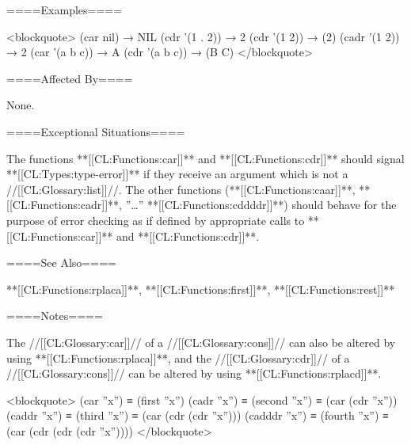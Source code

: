====Examples====

<blockquote> (car nil) → NIL (cdr '(1 . 2)) → 2 (cdr '(1 2)) → (2) (cadr '(1 2)) → 2 (car '(a b c)) → A (cdr '(a b c)) → (B C) </blockquote>

====Affected By====

None.

====Exceptional Situations====

The functions **[[CL:Functions:car]]** and **[[CL:Functions:cdr]]** should signal **[[CL:Types:type-error]]** if they receive an argument which is not a //[[CL:Glossary:list]]//. The other functions (**[[CL:Functions:caar]]**, **[[CL:Functions:cadr]]**, ''\ldots'' **[[CL:Functions:cddddr]]**) should behave for the purpose of error checking as if defined by appropriate calls to **[[CL:Functions:car]]** and **[[CL:Functions:cdr]]**.

====See Also====

**[[CL:Functions:rplaca]]**, **[[CL:Functions:first]]**, **[[CL:Functions:rest]]**

====Notes====

The //[[CL:Glossary:car]]// of a //[[CL:Glossary:cons]]// can also be altered by using **[[CL:Functions:rplaca]]**, and the //[[CL:Glossary:cdr]]// of a //[[CL:Glossary:cons]]// can be altered by using **[[CL:Functions:rplacd]]**.

<blockquote> (car ''x'') ≡ (first ''x'') (cadr ''x'') ≡ (second ''x'') ≡ (car (cdr ''x'')) (caddr ''x'') ≡ (third ''x'') ≡ (car (cdr (cdr ''x''))) (cadddr ''x'') ≡ (fourth ''x'') ≡ (car (cdr (cdr (cdr ''x'')))) </blockquote>

